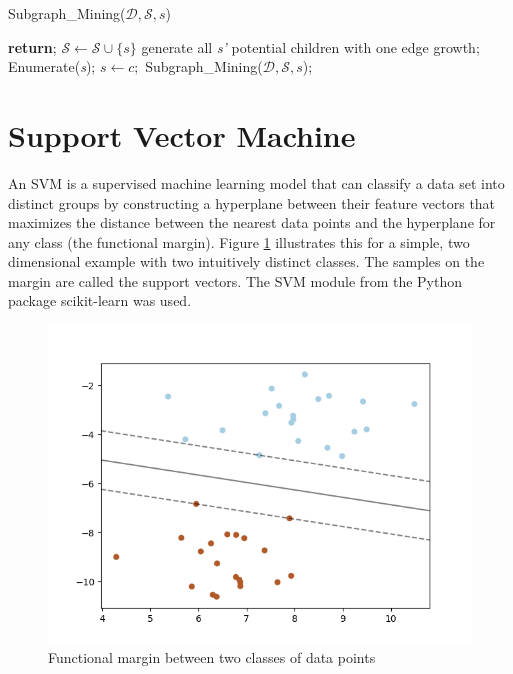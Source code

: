 \documentclass[pdftex,12pt,a4paper]{report}
\begin{document}
\begin{algorithm}
	\caption[Subgraph\_Mining($\mathcal{D, S}, s$)]{Subgraph\_Mining($\mathcal{D, S}, s$)\cite{Yan2002-hg}}
	\label{alg:subgraph_mining}
	\begin{algorithmic}[1]
		\State \textbf{return};
		\EndIf
		\State $\mathcal S \gets \mathcal S \cup \{s\}$
		\State generate all \textit{s'} potential children with one edge growth;
		\State Enumerate(\textit{s});
		\State $s \gets c;$
		\State Subgraph\_Mining($\mathcal{D, S}, s$);
		\EndIf
		\EndFor
	\end{algorithmic}
\end{algorithm}

\section{Support Vector Machine}
An SVM\cite{Cortes1995-ix} is a supervised machine learning model that can classify a data set into distinct groups by constructing a hyperplane between their feature vectors that maximizes the distance between the nearest data points and the hyperplane for any class (the functional margin). Figure \ref{fig:hyperplane} illustrates this for a simple, two dimensional example with two intuitively distinct classes. The samples on the margin are called the support vectors. The SVM module from the Python package scikit-learn\cite{Pedregosa2011-ld} was used.
\begin{figure}
	\centering
	\noindent\includegraphics[width=\linewidth]{images/sphx_glr_plot_separating_hyperplane_0011}
	\caption[Functional margin between two classes of data points]{Functional margin between two classes of data points\cite{noauthor_undated-io}}
	\label{fig:hyperplane}
\end{figure}
\end{document}
